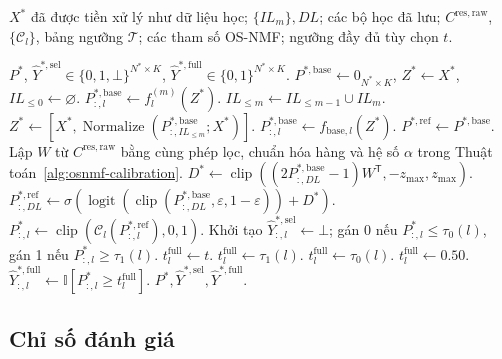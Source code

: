 \documentclass[11pt,a4paper]{article}
\newcounter{alg}
\begin{document}
\begin{algorithm}[H]
\caption{Suy luận xác suất, dự đoán chọn lọc và dự đoán đầy đủ}
\label{alg:inference}
\footnotesize
\begin{algorithmic}[1]
\renewcommand{\algorithmicrequire}{\textbf{Đầu vào:}}
\renewcommand{\algorithmicensure}{\textbf{Đầu ra:}}
\REQUIRE \parbox[t]{0.82\linewidth}{\(X^*\) đã được tiền xử lý như dữ liệu học; \(\{IL_m\},DL\); các bộ học đã lưu; \(C^{\mathrm{res,raw}}\), \(\{\mathcal C_l\}\), bảng ngưỡng \(\mathcal T\); các tham số OS-NMF; ngưỡng đầy đủ tùy chọn \(t\).}
\ENSURE \(P^*\), \(\hat Y^{*,\mathrm{sel}}\in\{0,1,\bot\}^{N^*\times K}\), \(\hat Y^{*,\mathrm{full}}\in\{0,1\}^{N^*\times K}\).
\STATE \(P^{*,\mathrm{base}}\gets0_{N^*\times K}\), \(Z^*\gets X^*\), \(IL_{\le0}\gets\varnothing\).
    \STATE \(P^{*,\mathrm{base}}_{:,l}\gets f_l^{(m)}(Z^*)\).
  \ENDFOR
  \STATE \(IL_{\le m}\gets IL_{\le m-1}\cup IL_m\).
  \STATE \(Z^*\gets[X^*,\operatorname{Normalize}(P^{*,\mathrm{base}}_{:,IL_{\le m}};X^*)]\).
\ENDFOR
{}
  \STATE \(P^{*,\mathrm{base}}_{:,l}\gets f_{\mathrm{base},l}(Z^*)\).
\ENDFOR
\STATE \(P^{*,\mathrm{ref}}\gets P^{*,\mathrm{base}}\).
  \STATE Lập \(W\) từ \(C^{\mathrm{res,raw}}\) bằng cùng phép lọc, chuẩn hóa hàng và hệ số \(\alpha\) trong Thuật toán~\ref{alg:osnmf-calibration}.
  \STATE \(D^*\gets\operatorname{clip}((2P^{*,\mathrm{base}}_{:,DL}-1)W^{\mathsf T},-z_{\max},z_{\max})\).
  \STATE \(P^{*,\mathrm{ref}}_{:,DL}\gets\sigma\!\left(\operatorname{logit}(\operatorname{clip}(P^{*,\mathrm{base}}_{:,DL},\varepsilon,1-\varepsilon))+D^*\right)\).
\ENDIF
{}
  \STATE \(P^*_{:,l}\gets\operatorname{clip}(\mathcal C_l(P^{*,\mathrm{ref}}_{:,l}),0,1)\).
  \STATE Khởi tạo \(\hat Y^{*,\mathrm{sel}}_{:,l}\gets\bot\); gán 0 nếu \(P^*_{:,l}\le\tau_0(l)\), gán 1 nếu \(P^*_{:,l}\ge\tau_1(l)\).
    \STATE \(t_l^{\mathrm{full}}\gets t\).
    \STATE \(t_l^{\mathrm{full}}\gets\tau_1(l)\).
    \STATE \(t_l^{\mathrm{full}}\gets\tau_0(l)\).
  \ELSE
    \STATE \(t_l^{\mathrm{full}}\gets0.50\).
  \ENDIF
  \STATE \(\hat Y^{*,\mathrm{full}}_{:,l}\gets\mathbb I[P^*_{:,l}\ge t_l^{\mathrm{full}}]\).
\ENDFOR
\RETURN \(P^*,\hat Y^{*,\mathrm{sel}},\hat Y^{*,\mathrm{full}}\).
\end{algorithmic}
\end{algorithm}

\subsection{Chỉ số đánh giá}
\end{document}
